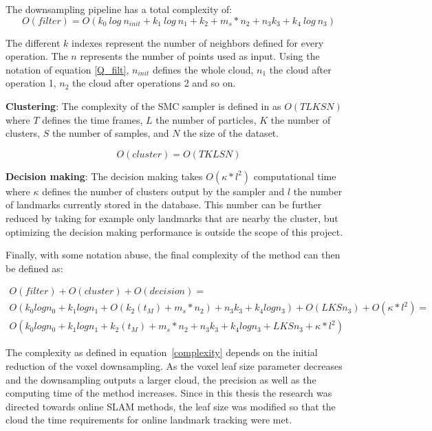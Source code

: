 \documentclass[twoside,hidelinks]{article}
\begin{document}
The downsampling pipeline has a total complexity of:
\begin{equation} \label{Q_filt}
O(filter) = O(k_{0}\ log\ n_{init} + k_{1}\ log\ n_{1} + k_{2}+ m_s*n_{2} + n_{3}k_{3} + k_{4}\ log\ n_{3} )
\end{equation}

The different $k$ indexes represent the number of neighbors defined for every operation. The $n$ represents the number of points used as input. Using the notation of equation \ref{Q_filt}, $n_{init}$ defines the whole cloud, $n_1$ the cloud after operation 1, $n_2$ the cloud after operations 2 and so on.

\textbf{Clustering}: The complexity of the SMC sampler is defined in \cite{smcddp} as $O(TLKSN)$ where $T$ defines the time frames, $L$ the number of particles, $K$ the number of clusters, $S$ the number of samples, and $N$ the size of the dataset. 

$$
O(cluster) = O(TKLSN)
$$

\textbf{Decision making}: The decision making takes $ O(\kappa * l^2) $ computational time where $\kappa$ defines the number of clusters output by the sampler and $l$ the number of landmarks currently stored in the database. This number can be further reduced by taking for example only landmarks that are nearby the cluster, but optimizing the decision making performance is outside the scope of this project.


Finally, with some notation abuse, the final complexity of the method can then be defined as:

\begin{equation} \label{complexity}
\begin{split}
O(filter) + O(cluster) + O(decision) = \\
O(k_{0}logn_{0} + k_{1}logn_{1} + O(k_{2}(t_M)+ m_s*n_{2}) + n_{3}k_{3} + k_{4}logn_{3} ) + O(LKSn_3) + O(\kappa * l^2)=\\
O(k_{0}logn_{0} + k_{1}logn_{1} + k_{2}(t_M)+ m_s*n_{2} + n_{3}k_{3} + k_{4}logn_{3} + LKSn_3 + \kappa * l^2)
\end{split}
\end{equation}

The complexity as defined in equation~\ref{complexity} depends on the initial reduction of the voxel downsampling. As the voxel leaf size parameter decreases and the downsampling outputs a larger cloud, the precision as well as the computing time of the method increases. Since in this thesis the research was directed towards online SLAM methods, the leaf size was modified so that the cloud the time requirements for online landmark tracking were met.
\end{document}
